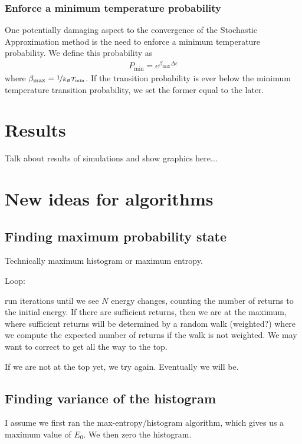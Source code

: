 \documentclass[letterpaper,twocolumn,amsmath,amssymb,pre,aps,10pt]{revtex4-1}
\begin{document}
\subsubsection{Enforce a minimum temperature probability}
One potentially damaging aspect to the convergence of the Stochastic Approximation method is the need to enforce a minimum temperature probability.  We define this probability as 
\begin{align}
P_{\text{min}} = e^{\beta_{\text{max}}\Delta\epsilon}
\end{align}
where $\beta_{\text{max}} = \nicefrac{1}{k_B T_\text{min}}$.  If the transition probability is ever below the minimum temperature transition probability, we set the former equal to the later.

\section{Results}

Talk about results of simulations and show graphics here...


\section{New ideas for algorithms}

\subsection{Finding maximum probability state}

Technically maximum histogram or maximum entropy.

Loop:

run iterations until we see $N$ energy changes, counting the number of
returns to the initial energy.  If there are sufficient returns, then
we are at the maximum, where sufficient returns will be determined by
a random walk (weighted?) where we compute the expected number of
returns if the walk is not weighted.  We may want to correct to get
all the way to the top.

If we are not at the top yet, we try again.  Eventually we will be.

\subsection{Finding variance of the histogram}

I assume we first ran the max-entropy/histogram algorithm, which gives
us a maximum value of $E_0$.  We then zero the histogram.
\end{document}
